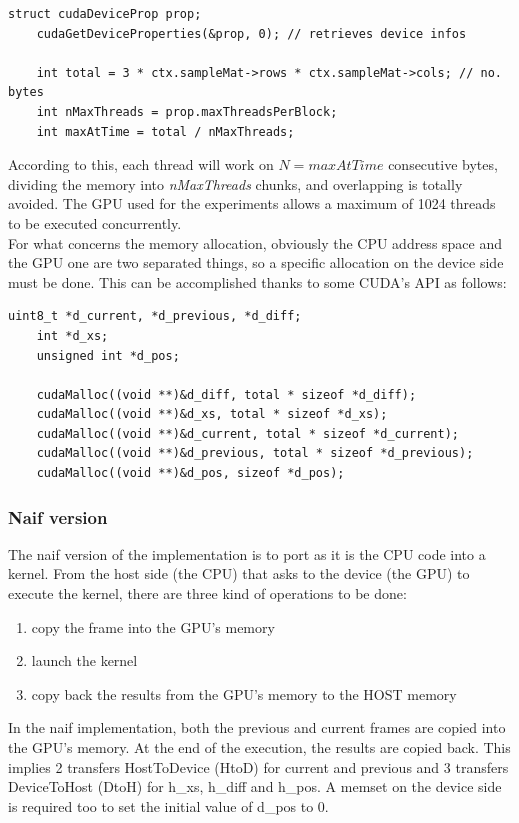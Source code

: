 \documentclass[paper=a4, fontsize=10pt]{scrartcl}	%
\begin{document}
	\begin{lstlisting}[style=CStyle]
	struct cudaDeviceProp prop;
	cudaGetDeviceProperties(&prop, 0); // retrieves device infos

	int total = 3 * ctx.sampleMat->rows * ctx.sampleMat->cols; // no. bytes
	int nMaxThreads = prop.maxThreadsPerBlock;
	int maxAtTime = total / nMaxThreads;
	\end{lstlisting}

	According to this, each thread will work on $N = \textit{maxAtTime}$ consecutive bytes, dividing the memory into \textit{nMaxThreads} chunks, and overlapping is totally avoided. The GPU used for the experiments allows a maximum of 1024 threads to be executed concurrently.\\

	For what concerns the memory allocation, obviously the CPU address space and the GPU one are two separated things, so a specific allocation on the device side must be done. This can be accomplished thanks to some CUDA's API as follows:

	\begin{lstlisting}[style=CStyle]
	uint8_t *d_current, *d_previous, *d_diff;
	int *d_xs;
	unsigned int *d_pos;

	cudaMalloc((void **)&d_diff, total * sizeof *d_diff);
	cudaMalloc((void **)&d_xs, total * sizeof *d_xs);
	cudaMalloc((void **)&d_current, total * sizeof *d_current);
	cudaMalloc((void **)&d_previous, total * sizeof *d_previous);
	cudaMalloc((void **)&d_pos, sizeof *d_pos);
	\end{lstlisting}


	\subsubsection{Naif version}

	The naif version of the implementation is to port as it is the CPU code into a kernel. From the host side (the CPU) that asks to the device (the GPU) to execute the kernel, there are three kind of operations to be done:

	\begin{enumerate}
		\itemsep0sp
		\item copy the frame into the GPU's memory
		\item launch the kernel
		\item copy back the results from the GPU's memory to the HOST memory
	\end{enumerate}

	In the naif implementation, both the previous and current frames are copied into the GPU's memory. At the end of the execution, the results are copied back. This implies 2 transfers HostToDevice (HtoD) for current and previous and 3 transfers DeviceToHost (DtoH) for h\_xs, h\_diff and h\_pos. A memset on the device side is required too to set the initial value of d\_pos to 0.\\
\end{document}
